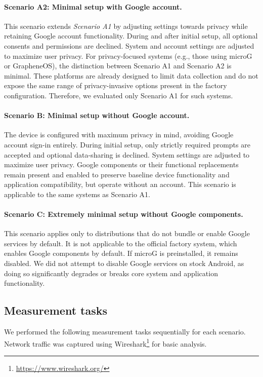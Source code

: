 \paragraph{Scenario A2: Minimal setup with Google account.}
This scenario extends \textit{Scenario A1} by adjusting settings towards privacy while retaining Google account functionality. During and after initial setup, all optional consents and permissions are declined. System and account settings are adjusted to maximize user privacy. For privacy-focused systems (e.g., those using microG or GrapheneOS), the distinction between Scenario A1 and Scenario A2 is minimal. These platforms are already designed to limit data collection and do not expose the same range of privacy-invasive options present in the factory configuration. Therefore, we evaluated only Scenario A1 for such systems.

\paragraph{Scenario B: Minimal setup without Google account.}
The device is configured with maximum privacy in mind, avoiding Google account sign-in entirely. During initial setup, only strictly required prompts are accepted and optional data-sharing is declined. System settings are adjusted to maximize user privacy. Google components or their functional replacements remain present and enabled to preserve baseline device functionality and application compatibility, but operate without an account. This scenario is applicable to the same systems as Scenario A1.

\paragraph{Scenario C: Extremely minimal setup without Google components.}
This scenario applies only to distributions that do not bundle or enable Google services by default. It is not applicable to the official factory system, which enables Google components by default. If microG is preinstalled, it remains disabled. We did not attempt to disable Google services on stock Android, as doing so significantly degrades or breaks core system and application functionality.

\subsection{Measurement tasks}
We performed the following measurement tasks sequentially for each scenario. Network traffic was captured using Wireshark\footnote{\url{https://www.wireshark.org/}} for basic analysis.

